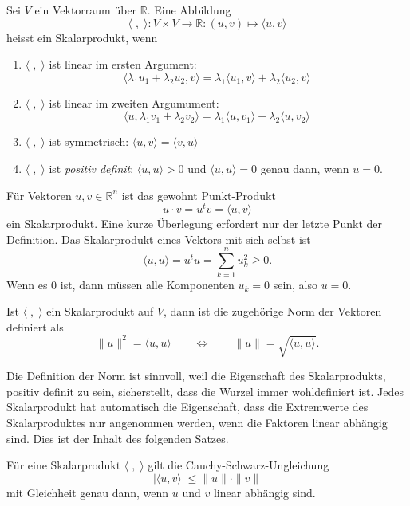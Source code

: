 \begin{definition}
Sei $V$ ein Vektorraum über $\mathbb R$.
Eine Abbildung
\[
\langle\;,\;\rangle
\colon
V\times V\to\mathbb R
:
(u,v)\mapsto \langle u,v\rangle
\]
heisst ein Skalarprodukt, wenn
\begin{enumerate}
\item $\langle\;,\;\rangle$ ist linear im ersten Argument:
\begin{equation}
\langle \lambda_1 u_1+\lambda_2 u_2,v\rangle
=
\lambda_1 \langle u_1,v\rangle
+
\lambda_2 \langle u_2,v\rangle
\end{equation}
\item $\langle\;,\;\rangle$ ist linear im zweiten Argumument:
\begin{equation}
\langle u,\lambda_1 v_1+\lambda_2 v_2\rangle
=
\lambda_1 \langle u,v_1\rangle
+
\lambda_2 \langle u,v_2\rangle
\end{equation}
\item
$\langle\;,\;\rangle$
ist symmetrisch:
$\langle u,v\rangle=\langle v,u\rangle$
\item
$\langle\;,\;\rangle$
ist {\em positiv definit}: $\langle u,u\rangle > 0$ und
$\langle u,u\rangle=0$ genau dann, wenn $u=0$.
\end{enumerate}
\end{definition}

Für Vektoren $u,v\in\mathbb R^n$ ist das gewohnt Punkt-Produkt
\[
u\cdot v = u^t v = \langle u,v\rangle
\]
ein Skalarprodukt.
Eine kurze Überlegung erfordert nur der letzte Punkt der Definition.
Das Skalarprodukt eines Vektors mit sich selbst ist 
\[
\langle u,u\rangle = u^t u = \sum_{k=1}^n u_k^2 \ge 0.
\]
Wenn es $0$ ist, dann müssen alle Komponenten $u_k=0$ sein, also $u=0$.

\begin{definition}
Ist $\langle\;,\;\rangle$ ein Skalarprodukt auf $V$, dann ist die zugehörige
Norm der Vektoren definiert als
\[
\| u \|^2 = \langle u,u\rangle
\qquad\Leftrightarrow\qquad
\| u\| = \sqrt{\langle u,u\rangle}.
\]
\end{definition}

Die Definition der Norm ist sinnvoll, weil die Eigenschaft des Skalarprodukts,
positiv definit zu sein, sicherstellt, dass die Wurzel immer wohldefiniert
ist.
Jedes Skalarprodukt hat automatisch die Eigenschaft, dass die Extremwerte
des Skalarproduktes nur angenommen werden, wenn die Faktoren linear
abhängig sind.
Dies ist der Inhalt des folgenden Satzes.

\begin{satz}
Für eine Skalarprodukt $\langle\;,\;\rangle$ gilt die
Cauchy-Schwarz-Ungleichung
\begin{equation}
|\langle u,v\rangle| \le \| u\|\cdot\| v\|
\label{geometrie:cauchy-schwarz}
\end{equation}
mit Gleichheit genau dann, wenn $u$ und $v$ linear abhängig sind.
\end{satz}

